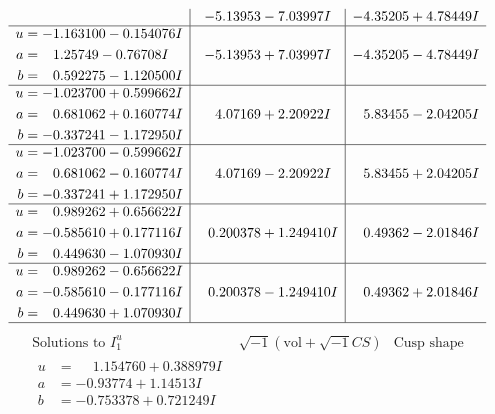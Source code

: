 \documentclass[1p]{elsarticle_modified}
\theoremstyle{definition}
\newcommand{\I}{\sqrt{-1}}
\begin{document}
$$\begin{array}{c|c|c}
 & -5.13953 - 7.03997 I & -4.35205 + 4.78449 I \\ \hline\begin{aligned}
u &= -1.163100 - 0.154076 I \\
a &= \phantom{-}1.25749 - 0.76708 I \\
b &= \phantom{-}0.592275 - 1.120500 I\end{aligned}
 & -5.13953 + 7.03997 I & -4.35205 - 4.78449 I \\ \hline\begin{aligned}
u &= -1.023700 + 0.599662 I \\
a &= \phantom{-}0.681062 + 0.160774 I \\
b &= -0.337241 - 1.172950 I\end{aligned}
 & \phantom{-}4.07169 + 2.20922 I & \phantom{-}5.83455 - 2.04205 I \\ \hline\begin{aligned}
u &= -1.023700 - 0.599662 I \\
a &= \phantom{-}0.681062 - 0.160774 I \\
b &= -0.337241 + 1.172950 I\end{aligned}
 & \phantom{-}4.07169 - 2.20922 I & \phantom{-}5.83455 + 2.04205 I \\ \hline\begin{aligned}
u &= \phantom{-}0.989262 + 0.656622 I \\
a &= -0.585610 + 0.177116 I \\
b &= \phantom{-}0.449630 - 1.070930 I\end{aligned}
 & \phantom{-}0.200378 + 1.249410 I & \phantom{-}0.49362 - 2.01846 I \\ \hline\begin{aligned}
u &= \phantom{-}0.989262 - 0.656622 I \\
a &= -0.585610 - 0.177116 I \\
b &= \phantom{-}0.449630 + 1.070930 I\end{aligned}
 & \phantom{-}0.200378 - 1.249410 I & \phantom{-}0.49362 + 2.01846 I\\
 \hline 
 \end{array}$$\newpage$$\begin{array}{c|c|c}  
\text{Solutions to }I^u_{1}& \I (\text{vol} + \sqrt{-1}CS) & \text{Cusp shape}\\
 \hline 
\begin{aligned}
u &= \phantom{-}1.154760 + 0.388979 I \\
a &= -0.93774 + 1.14513 I \\
b &= -0.753378 + 0.721249 I\end{aligned}

\end{array}$$
\end{document}
